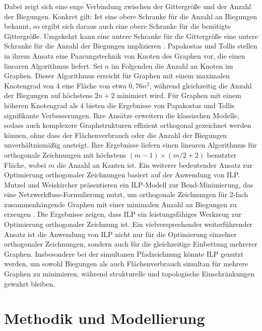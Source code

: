 \documentclass[bachelor, german]{algothesis}
\begin{document}
Dabei zeigt sich eine enge Verbindung zwischen der Gittergröße und der Anzahl der Biegungen. Konkret gilt: Ist eine obere Schranke für die Anzahl an Biegungen bekannt, so ergibt sich daraus auch eine obere Schranke für die benötigte Gittergröße. Umgekehrt kann eine untere Schranke für die Gittergröße eine untere Schranke für die Anzahl der Biegungen implizieren \cite{BendsSize}.\newline 
Papakostas und Tollis \cite{Pairing} stellen in ihrem Ansatz eine Paarungstechnik von Knoten des Graphen vor, die einen linearen Algorithmus liefert. Sei $n$ im Folgenden die Anzahl an Knoten im Graphen. Dieser Algorithmus erreicht für Graphen mit einem maximalen Knotengrad von 4 eine Fläche von etwa $0,76n^2$, während gleichzeitig die Anzahl der Biegungen  auf höchstens $2n+2$ minimiert wird. Für Graphen mit einem höheren Knotengrad als 4 bieten die Ergebnisse von Papakostas und Tollis \cite{Papakostas2000} signifikante Verbesserungen. Ihre Ansätze erweitern die klassischen Modelle, sodass auch komplexere Graphstrukturen effizient orthogonal gezeichnet werden können, ohne dass der Flächenverbrauch oder die Anzahl der Biegungen unverhältnismäßig ansteigt. Ihre Ergebnisse liefern einen linearen Algorithmus für orthogonale Zeichnungen mit höchstens $(m-1)\times (m/2 + 2)$ benutzter Fläche, wobei $m$ die Anzahl an Kanten ist.\newline
Ein weiterer bedeutender Ansatz zur Optimierung orthogonaler Zeichnungen basiert auf der Anwendung von ILP. Mutzel und Weiskircher präsentieren ein ILP-Modell zur Bend-Minimierung, das eine Netzwerkfluss-Formulierung nutzt, um orthogonale Zeichnungen für 2-fach zusammenhängende Graphen mit einer minimalen Anzahl an Biegungen zu erzeugen \cite{ILPBEND}.\newline
Die Ergebnisse zeigen, dass ILP ein leistungsfähiges Werkzeug zur Optimierung orthogonaler Zeichnung ist. Ein vielversprechender weiterführender Ansatz ist die Anwendung von ILP nicht nur für die Optimierung einzelner orthogonaler Zeichnungen, sondern auch für die gleichzeitige Einbettung mehrerer Graphen. Insbesondere bei der simultanen Pfadzeichnung könnte ILP genutzt werden, um sowohl Biegungen als auch Flächenverbrauch simultan für mehrere Graphen zu minimieren, während strukturelle und topologische Einschränkungen gewahrt bleiben.


\chapter{Methodik und Modellierung}
\end{document}
